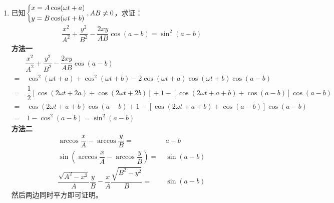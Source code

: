 \begin{enumerate}[label={【\textbf{例\thechapter.\arabic*}】},
 leftmargin=\inteval{\myenumleftmargin}pt,
 itemsep=\inteval{\myenumitempsep}pt,
 itemindent=\inteval{\myenumitemindent}pt]
\item 已知$ \begin{dcases}
    x=A\cos(\omega t+a) \\
    y=B\cos(\omega t+b)
\end{dcases}, AB\neq 0 $，求证：
\begin{align}\label{斜椭圆消参例题}
    \dfrac{x^2}{A^2}+\dfrac{y^2}{B^2}-\dfrac{2xy}{AB}\cos(a-b)=\sin^2(a-b)
\end{align}
\textbf{方法一}\ 
\begin{align*}
    & \dfrac{x^2}{A^2}+\dfrac{y^2}{B^2}-\dfrac{2xy}{AB}\cos(a-b) \\
    =&\  \cos^2(\omega t+a)+\cos^2(\omega t+b)-2\cos(\omega t+a)\cos(\omega t+b)\cos(a-b) \\
    =&\  \dfrac{1}{2}[\cos(2\omega t+2a)+\cos(2\omega t+2b)]+1-[\cos(2\omega t+a+b)+\cos(a-b)]\cos(a-b)\\
    =&\  \cos(2\omega t+a+b)\cos(a-b) +1-[\cos(2\omega t+a+b)+\cos(a-b)]\cos(a-b)\\
    =&\  1-\cos^2(a-b) =\sin^2(a-b)
\end{align*}
\textbf{方法二}\ 
\begin{align*}
    \arccos\dfrac{x}{A}-\arccos\dfrac{y}{B}=&\ a-b \\
    \sin\left( \arccos\dfrac{x}{A}-\arccos\dfrac{y}{B} \right) =&\ \sin(a-b) \\
    \dfrac{\sqrt{A^2-x^2}}{A}\dfrac{y}{B}-\dfrac{x}{A}\dfrac{\sqrt{B^2-y^2}}{B}=&\ \sin(a-b)
\end{align*}
然后两边同时平方即可证明。


\end{enumerate}
